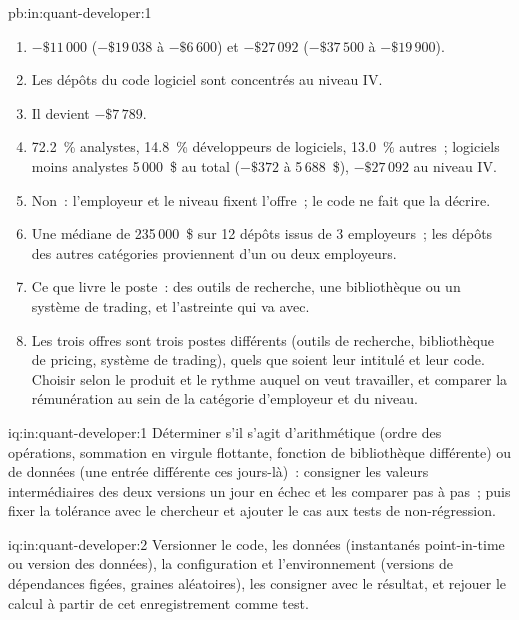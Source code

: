 \begin{solution}{pb:in:quant-developer:1}
\begin{enumerate}
\item $-\$11\,000$ ($-\$19\,038$ à $-\$6\,600$) et $-\$27\,092$ ($-\$37\,500$ à $-\$19\,900$).
\item Les dépôts du code logiciel sont concentrés au niveau IV.
\item Il devient $-\$7\,789$.
\item 72.2~\% analystes, 14.8~\% développeurs de logiciels, 13.0~\% autres~; logiciels moins analystes 5\,000~\$ au total ($-\$372$ à
5\,688~\$), $-\$27\,092$ au niveau IV.
\item Non~: l'employeur et le niveau fixent l'offre~; le code ne fait que la décrire.
\item Une médiane de 235\,000~\$ sur 12 dépôts issus de 3 employeurs~; les dépôts des autres catégories proviennent d'un ou deux employeurs.
\item Ce que livre le poste~: des outils de recherche, une bibliothèque ou un système de trading, et l'astreinte qui va avec.
\item Les trois offres sont trois postes différents (outils de recherche, bibliothèque de pricing, système de trading), quels que soient leur intitulé
et leur code. Choisir selon le produit et le rythme auquel on veut travailler, et comparer la rémunération au sein de la catégorie d'employeur et du niveau.
\end{enumerate}
\end{solution}

\begin{solution}{iq:in:quant-developer:1}
Déterminer s'il s'agit d'arithmétique (ordre des opérations, sommation en virgule flottante, fonction de bibliothèque différente) ou de données (une
entrée différente ces jours-là)~: consigner les valeurs intermédiaires des deux versions un jour en échec et les comparer pas à pas~; puis
fixer la tolérance avec le chercheur et ajouter le cas aux tests de non-régression.
\end{solution}

\begin{solution}{iq:in:quant-developer:2}
Versionner le code, les données (instantanés point-in-time ou version des données), la configuration et l'environnement
(versions de dépendances figées, graines aléatoires), les consigner avec le résultat, et rejouer le calcul à partir de cet enregistrement comme test.
\end{solution}

